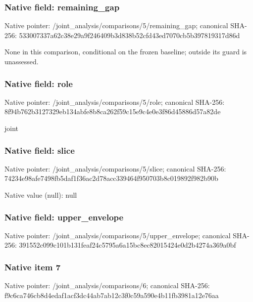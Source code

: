 \documentclass[10pt,a4paper]{article}
\begin{document}
\begingroup\raggedright{}\par\endgroup

\subsubsection{Native field: remaining\_\allowbreak{}gap}
Native pointer: /joint\_\allowbreak{}analysis/comparisons/5/remaining\_\allowbreak{}gap; canonical SHA-256: 533007337a62c38e29a9f246409b3d838b52cfd43ed7070cb5b397819317d86d

\begingroup\raggedright\sloppy None in this comparison,\allowbreak{} conditional on the frozen baseline;\allowbreak{} outside its guard is unassessed.\par\endgroup

\subsubsection{Native field: role}
Native pointer: /joint\_\allowbreak{}analysis/comparisons/5/role; canonical SHA-256: 8f94b762b3127329eb134abfe8b8ca262f59c15e9c4e0e3f86d45886d57a82de

\begingroup\raggedright\sloppy joint\par\endgroup

\subsubsection{Native field: slice}
Native pointer: /joint\_\allowbreak{}analysis/comparisons/5/slice; canonical SHA-256: 74234e98afe7498fb5daf1f36ac2d78acc339464f950703b8c019892f982b90b

Native value (null): null

\subsubsection{Native field: upper\_\allowbreak{}envelope}
Native pointer: /joint\_\allowbreak{}analysis/comparisons/5/upper\_\allowbreak{}envelope; canonical SHA-256: 391552c099c101b131feaf24c5795a6a15bc8ec82015424e0d2b4274a369a0bf

\begingroup\raggedright{}\par\endgroup

\subsubsection{Native item 7}
Native pointer: /joint\_\allowbreak{}analysis/comparisons/6; canonical SHA-256: f9c6ca746cb8d4edaf1acf3dc44ab7ab12c3f0c59a590e4b11fb3981a12e76aa
\end{document}
